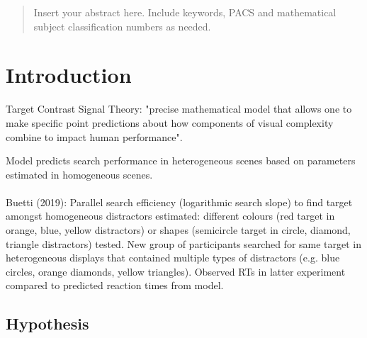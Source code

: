 \date{Received: date / Accepted: date}

\maketitle

\begin{abstract}
Insert your abstract here. Include keywords, PACS and mathematical
subject classification numbers as needed.
\end{abstract}

\section{Introduction}
\label{intro}

Target Contrast Signal Theory: "precise mathematical model that allows one to make specific point predictions about how components of visual complexity combine to impact human performance".

Model predicts search performance in heterogeneous scenes based on parameters estimated in homogeneous scenes. 

\paragraph{}

Buetti (2019): Parallel search efficiency (logarithmic search slope) to find target amongst homogeneous distractors estimated: different colours (red target in orange, blue, yellow distractors) or shapes (semicircle target in circle, diamond, triangle distractors) tested. 
New group of participants searched for same target in heterogeneous displays that contained multiple types of distractors (e.g. blue circles, orange diamonds, yellow triangles). Observed RTs in latter experiment compared to predicted reaction times from model.

\paragraph{} 

\subsection{Hypothesis}

